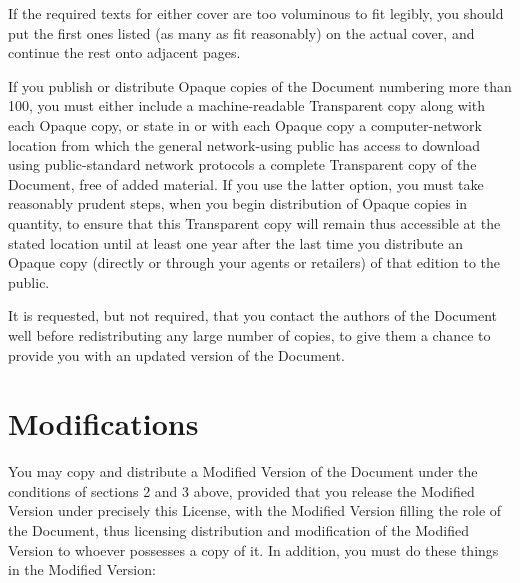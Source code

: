 \documentclass[12pt,a4paper,openany]{book}
\begin{document}
If the required texts for either cover are too voluminous to fit
legibly, you should put the first ones listed (as many as fit
reasonably) on the actual cover, and continue the rest onto adjacent
pages.

If you publish or distribute Opaque copies of the Document numbering
more than 100, you must either include a machine-readable Transparent
copy along with each Opaque copy, or state in or with each Opaque copy
a computer-network location from which the general network-using
public has access to download using public-standard network protocols
a complete Transparent copy of the Document, free of added material.
If you use the latter option, you must take reasonably prudent steps,
when you begin distribution of Opaque copies in quantity, to ensure
that this Transparent copy will remain thus accessible at the stated
location until at least one year after the last time you distribute an
Opaque copy (directly or through your agents or retailers) of that
edition to the public.

It is requested, but not required, that you contact the authors of the
Document well before redistributing any large number of copies, to give
them a chance to provide you with an updated version of the Document.

\section{Modifications}
\label{FDL:sec4}

You may copy and distribute a Modified Version of the Document under
the conditions of sections 2 and 3 above, provided that you release
the Modified Version under precisely this License, with the Modified
Version filling the role of the Document, thus licensing distribution
and modification of the Modified Version to whoever possesses a copy
of it.  In addition, you must do these things in the Modified Version:
\end{document}

